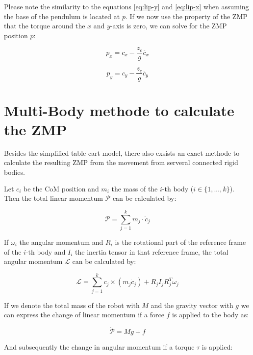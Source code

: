 \documentclass[english,ngerman]{KITreprt}
\begin{document}
Please note the similarity to the equations \ref{eq:lip-y} and
\ref{eq:lip-x} when assuming the base of the pendulum is located at $p$.
If we now use the property of the ZMP that the torque around the $x$ and
$y$-axis is zero, we can solve for the ZMP position $p$:

\begin{equation} \label{eq:zmp-x}
p_x = c_x - \frac{z_c}{g} \ddot{c_x}
\end{equation}

\begin{equation} \label{eq:zmp-y}
p_y = c_y - \frac{z_c}{g} \ddot{c_y}
\end{equation}

\section{Multi-Body methode to calculate the
ZMP}\label{multi-body-methode-to-calculate-the-zmp}

Besides the simplified table-cart model, there also exsists an exact
methode to calculate the resulting ZMP from the movement from serveral
connected rigid bodies.

Let $c_i$ be the CoM position and $m_i$ the mass of the $i$-th body
($i \in \{1, ..., k\}$). Then the total linear momentum $\mathcal{P}$
can be calculated by:

\begin{equation}
\mathcal{P} = \sum^k_{j=1} m_j \cdot \dot{c}_j
\end{equation}

If $\omega_i$ the angular momentum and $R_i$ is the rotational part of
the reference frame of the $i$-th body and $I_i$ the inertia tensor in
that reference frame, the total angular momentum $\mathcal{L}$ can be
calculated by:

\begin{equation}
\mathcal{L} = \sum^k_{j=1} c_j \times (m_j \dot{c}_j) + R_j I_j R^T_j \omega_j
\end{equation}

If we denote the total mass of the robot with $M$ and the gravity vector
with $g$ we can express the change of linear momentum if a force $f$ is
applied to the body as:

\begin{equation} \label{eq:change-lin-momentum}
\dot{\mathcal{P}} = M g + f
\end{equation}

And subsequently the change in angular momentum if a torque $\tau$ is
applied:
\end{document}
